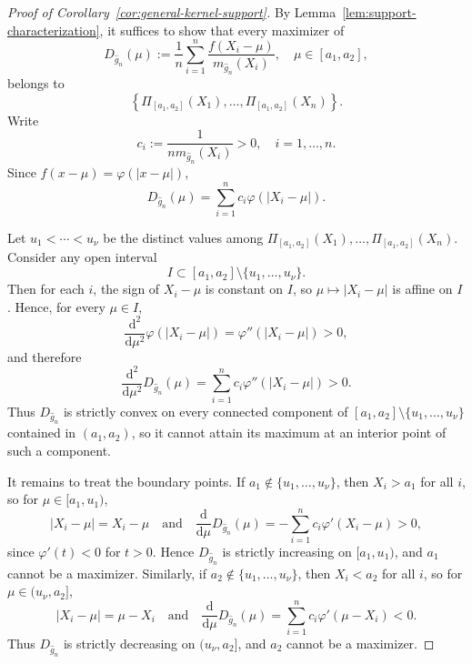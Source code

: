 \documentclass[english, 11pt]{article}
\theoremstyle{plain}
\theoremstyle{definition}
\theoremstyle{remark}
\begin{document}
\begin{appendix}
\restategeneralkernel*

\begin{proof}[Proof of Corollary~\ref{cor:general-kernel-support}]
By Lemma~\ref{lem:support-characterization}, it suffices to show that every maximizer of
\begin{equation*}
D_{\widehat g_n}(\mu):=\frac{1}{n}\sum_{i=1}^n \frac{f(X_i-\mu)}{m_{\widehat g_n}(X_i)},\quad \mu\in[a_1,a_2],
\end{equation*}
belongs to
\begin{equation*}
\left\{\Pi_{[a_1,a_2]}(X_1),\dots,\Pi_{[a_1,a_2]}(X_n)\right\}.
\end{equation*}
Write
\begin{equation*}
c_i:=\frac{1}{n m_{\widehat g_n}(X_i)}>0,\quad i=1,\dots,n.
\end{equation*}
Since $f(x-\mu)=\varphi(|x-\mu|)$,
\begin{equation*}
D_{\widehat g_n}(\mu)=\sum_{i=1}^n c_i \varphi(|X_i-\mu|).
\end{equation*}

Let $u_1<\cdots<u_{\nu}$ be the distinct values among
$\Pi_{[a_1,a_2]}(X_1),\dots,\Pi_{[a_1,a_2]}(X_n)$.
Consider any open interval
\begin{equation*}
I\subset [a_1,a_2]\setminus\{u_1,\dots,u_{\nu}\}.
\end{equation*}
Then for each $i$, the sign of $X_i-\mu$ is constant on $I$, so $\mu\mapsto |X_i-\mu|$ is affine on $I$. Hence, for every $\mu\in I$,
\begin{equation*}
\frac{\mathrm d^2}{\mathrm d\mu^2}\varphi(|X_i-\mu|)=\varphi''(|X_i-\mu|)>0,
\end{equation*}
and therefore
\begin{equation*}
\frac{\mathrm d^2}{\mathrm d\mu^2}D_{\widehat g_n}(\mu)=\sum_{i=1}^n c_i \varphi''(|X_i-\mu|)>0.
\end{equation*}
Thus $D_{\widehat g_n}$ is strictly convex on every connected component of
$[a_1,a_2]\setminus\{u_1,\dots,u_{\nu}\}$ contained in $(a_1,a_2)$, so it cannot attain its maximum at an interior point of such a component.

It remains to treat the boundary points. If $a_1\notin\{u_1,\dots,u_{\nu}\}$, then $X_i>a_1$ for all $i$, so for $\mu\in [a_1,u_1)$,
\begin{equation*}
|X_i-\mu|=X_i-\mu\quad\text{and}\quad\frac{\mathrm d}{\mathrm d\mu}D_{\widehat g_n}(\mu)=-\sum_{i=1}^n c_i \varphi'(X_i-\mu)>0,
\end{equation*}
since $\varphi'(t)<0$ for $t>0$. Hence $D_{\widehat g_n}$ is strictly increasing on $[a_1,u_1)$, and $a_1$ cannot be a maximizer. Similarly, if $a_2\notin\{u_1,\dots,u_{\nu}\}$, then $X_i<a_2$ for all $i$, so for $\mu\in (u_{\nu},a_2]$,
\begin{equation*}
|X_i-\mu|=\mu-X_i\quad\text{and}\quad\frac{\mathrm d}{\mathrm d\mu}D_{\widehat g_n}(\mu)=\sum_{i=1}^n c_i \varphi'(\mu-X_i)<0.
\end{equation*}
Thus $D_{\widehat g_n}$ is strictly decreasing on $(u_{\nu},a_2]$, and $a_2$ cannot be a maximizer.


\end{proof}
\end{appendix}
\end{document}
